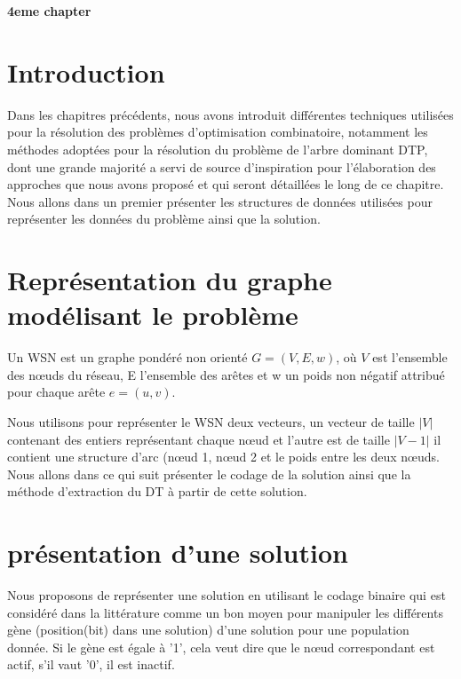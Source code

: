 \cleardoublepage


\setcounter{chapter}{4}
\setcounter{section}{0}
\setcounter{figure}{0}

\begin{center}
	\Huge\textbf{4eme chapter}
\end{center}

\section{Introduction}
Dans les chapitres précédents, nous avons introduit différentes techniques utilisées pour la résolution des problèmes d’optimisation combinatoire, notamment les méthodes adoptées pour la résolution du problème de l’arbre dominant DTP, dont une grande majorité a servi de source d’inspiration pour l’élaboration des approches que nous avons proposé et qui seront détaillées le long de ce chapitre.  Nous allons dans un premier présenter les structures de données utilisées pour représenter les données du problème ainsi que la solution.

\section{Représentation du graphe modélisant le problème}
Un WSN est un graphe pondéré non orienté $G=(V,E,w)$, où $V$ est l’ensemble des nœuds du réseau, E l’ensemble des arêtes et w un poids non négatif attribué pour chaque arête $e=(u,v)$. 

Nous utilisons pour représenter le WSN deux vecteurs, un vecteur de taille $|V|$ contenant des entiers représentant chaque nœud et l’autre est de taille $|V-1|$ il contient une structure d’arc (nœud 1, nœud 2 et le poids entre les deux nœuds. Nous allons dans ce qui suit présenter le codage de la solution ainsi que la méthode d'extraction du DT à partir de cette solution.


\section{présentation d’une solution}
Nous proposons de représenter une solution en utilisant le codage binaire qui est considéré dans la littérature comme un bon moyen pour manipuler les différents gène (position(bit) dans une solution) d’une solution pour une population donnée. Si le gène est égale à '1', cela veut dire que le nœud correspondant est actif, s'il vaut '0', il est inactif.


